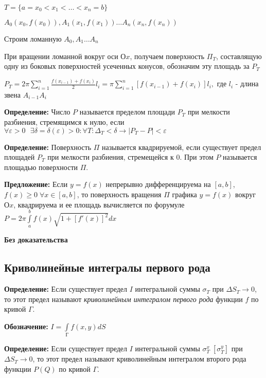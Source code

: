 \documentclass[a4paper,12pt]{article} %
\begin{document}
$T = \{ a = x_0 < x_1<\dots<x_n = b \}$



$A_0 (x_0, f(x_0)), A_1 (x_1, f(x_1)) \dots A_n(x_n, f(x_n))$ 

Строим ломанную $A_0, A_1\dots A_n$

При вращении ломанной вокруг оси $Оx$, получаем поверхность $\Pi_T$, составлящую одну из боковых поверхностей усеченных конусов, обозначим эту площадь за $P_T$

$P_T=2\pi \sum\limits_{i=1}^n \frac{f(x_{i-1})+f(x_i)}{2}l_i=\pi \sum\limits_{i=1}^n [f(x_{i-1})+f(x_i)]l_i,$ где $l_i$ - длина звена $A_{i-1}A_i$

\vspace{20}

\textbf{Определение:} Число $P$ называется пределом площади $P_T$ при мелкости разбиения, стремящимся к нулю, если $\forall \varepsilon > 0 \text{ }\exists \delta=\delta(\varepsilon) > 0 : \forall T: \Delta_T<\delta \rightarrow |P_T-P|<\varepsilon$

\vspace{20}

\textbf{Определение:}  Поверхность $\Pi$ называется квадрируемой, если существует предел площадей $P_T$ при мелкости разбиения,  стремещейся к 0. При этом $P$ называется площадью поверхности $\Pi$.

\vspace{20}

\textbf{Предложение:} Если $y=f(x)$ непрерывно дифференцируема на $[a, b]$, $f(x) \geq 0\; \forall x\in[a,b]$, то поверхность вращения $\Pi$ графика $y=f(x)$ вокруг $Оx$, квадрируема и ее площадь вычисляется по форумуле $P=2\pi \int\limits_a^b f(x) \sqrt{1+[f'(x)]^2}dx$

\textbf{Без доказательства}

\subsection*{Криволинейные интегралы первого рода}


\textbf{Определение:} Если существует предел $I$ интегральной суммы $\sigma_T$ при $\Delta S_T \rightarrow 0$, то этот предел называют \textit{криволинейным интегралом первого рода} функции $f$ по кривой $\Gamma$.

\vspace{20}
\textbf{Обозначение:} $I =\int\limits_Г f(x,y)dS$

\textbf{Определение:} Если существует предел $I$ интегральной суммы $\sigma_T^x\; [\sigma_T^y]$  при $\Delta S_T \rightarrow 0$, то этот предел называют криволинейным интегралом второго рода функции $P(Q)$ по кривой $\Gamma$.
\end{document}
